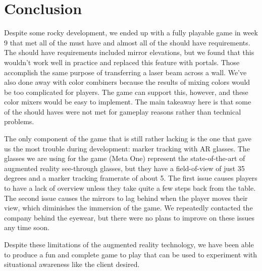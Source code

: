 \chapter{Conclusion} \label{cha:conclusion}
    
    Despite some rocky development, we ended up with a fully playable game in
    week 9 that met all of the must have and almost all of the should have
    requirements. The should have requirements included mirror elevations, but
    we found that this wouldn't work well in practice and replaced this feature
    with portals. Those accomplish the same purpose of transferring a laser beam
    across a wall. We've also done away with color combiners because the results
    of mixing colors would be too complicated for players. The game can support
    this, however, and these color mixers would be easy to implement. The main
    takeaway here is that some of the should haves were not met for gameplay
    reasons rather than technical problems.

    The only component of the game that is still rather lacking is the one that
    gave us the most trouble during development: marker tracking with AR
    glasses. The glasses we are using for the game (Meta One) represent the
    state-of-the-art of augmented reality see-through glasses, but they have a
    field-of-view of just 35 degrees and a marker tracking framerate of about 5.
    The first issue causes players to have a lack of overview unless they take
    quite a few steps back from the table. The second issue causes the mirrors
    to lag behind when the player moves their view, which diminishes the
    immersion of the game. We repeatedly contacted the company behind the
    eyewear, but there were no plans to improve on these issues any time soon.

    Despite these limitations of the augmented reality technology, we have been
    able to produce a fun and complete game to play that can be used to
    experiment with situational awareness like the client desired.